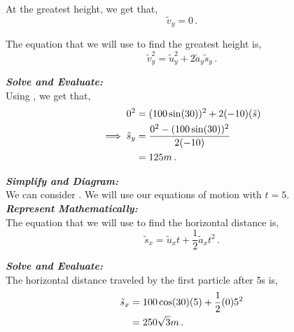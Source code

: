 \begin{subquestions}
At the greatest height, we get that,
\begin{equation}
	\tilde{v}_y = 0 \,.
\end{equation}

The equation that we will use to find the greatest height is,
\begin{equation}
	\tilde{v}_y^2 = \tilde{u}_y^2 + 2\tilde{a}_y\tilde{s}_y \,. \label{2008J:q6:SEqn1} 
\end{equation}




\textbf{\textit{Solve and Evaluate:}} \\
Using , we get that,
\begin{align}
	0^2 & = (100\sin(30))^2 + 2(-10)(\tilde{s}) \nonumber \\
	\implies \tilde{s}_y & = \frac{0^2-(100\sin(30))^2}{2(-10)} \nonumber \\
		& = 125m \,.
\end{align}


\subquestion

\begin{subsubquestions}
	
\subsubquestion

\textbf{\textit{Simplify and Diagram:}} \\
We can consider . We will use our equations of motion with $t=5$.\\




\textbf{\textit{Represent Mathematically:}} \\			
The equation that we will use to find the horizontal distance is,
\begin{equation}
	\tilde{s}_x =\tilde{u}_xt + \frac{1}{2}\tilde{a}_xt^2 \,.	
\end{equation}




\textbf{\textit{Solve and Evaluate:}} \\
The horizontal distance traveled by the first particle after 5s is,
\begin{align}
	\tilde{s}_x & = 100\cos(30)(5) + \frac{1}{2}(0)5^2 \nonumber \\
	    & = 250\sqrt{3}m \,.
\end{align}



\end{subsubquestions}
\end{subquestions}
